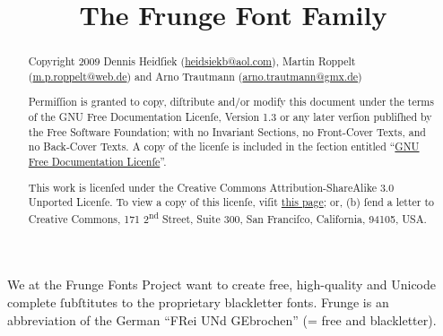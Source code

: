 \documentclass[
  ngerman,
  titlepage=no
]{scrartcl}
\title{The Frunge Font Family}
\author{\team}
\begin{document}
\begin{comment}
Engliſh long s rules:
End of word: s / Elſe: ſ
with f: sf/fs
with daſh at line end: ſ-
with apostrophe: s’
Italic writing: ſſ -> ſs
17th century: ſb ſk -> sb sk
\end{comment}

\begin{comment}
This document is free ſoftware: you can rediſtribute it and/or
modify it under the terms of the GNU General Public Licenſe as publiſhed by the
Free Software Foundation, either verſion 3 of the Licenſe, or (at your option)
any later verſion.

This document is diſtributed in the hope that it will be uſeful,
but WITHOUT ANY WARRANTY; without even the implied warranty of MERCHANTABILITY
or FITNESS FOR A PARTICULAR PURPOSE. See the GNU General Public Licenſe for more
details.

You ſhould have received a copy of the GNU General Public Licenſe
along with this document. If not, see: http://www.gnu.org/licenses/gpl.html
\end{comment}

\maketitle
\thispagestyle{empty}
\begin{abstract}
\large
Copyright 2009
Dennis Heidſiek (\href{mailto:heidsiekb@aol.com}{heidsiekb@aol.com}),
Martin Roppelt \break(\href{mailto:m.p.roppelt@web.de}{m.p.roppelt@web.de}) and
Arno Trautmann (\href{mailto:arno.trautmann@gmx.de}{arno.trautmann@gmx.de})

Permiſſion is granted to copy, diſtribute and/or modify this
document under the terms of the GNU Free Documentation Licenſe, Version 1.3 or
any later verſion publiſhed by the Free Software Foundation; with no Invariant
Sections, no Front-Cover Texts, and no Back-Cover Texts. A copy of the licenſe
is included in the ſection entitled “\hyperlink{fdl}{GNU Free Documentation
Licenſe}”.

This work is licenſed under the Creative Commons
Attribution-ShareAlike 3.0 Unported Licenſe. To view a copy of this licenſe,
viſit \href{http://creativecommons.org/licenses/by-sa/3.0/legalcode}{this page}; or, (b) ſend a letter
to Creative Commons, 171 2\textsuperscript{nd} Street, Suite 300, San Franciſco, California,
94105, USA.
\end{abstract}
\clearpage
\tableofcontents
{}
We at the Frunge Fonts Project want to create free, high-quality and Unicode
complete ſubſtitutes to the proprietary blackletter fonts. Frunge is an
abbreviation of the German “FRei UNd GEbrochen” (= free and blackletter).
\end{document}
